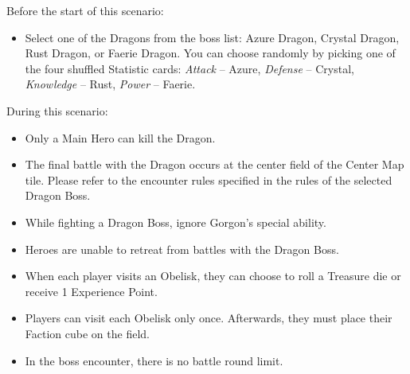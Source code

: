 \begin{multicols*}{2}
Before the start of this scenario:

\begin{itemize}
  \item Select one of the Dragons from the boss list: Azure Dragon, Crystal Dragon, Rust Dragon, or Faerie Dragon.
    You can choose randomly by picking one of the four shuffled Statistic cards: \textit{Attack} -- Azure, \textit{Defense} -- Crystal, \textit{Knowledge} -- Rust, \textit{Power} -- Faerie.
\end{itemize}

During this scenario:

\begin{itemize}
  \item Only a Main Hero can kill the Dragon.
  \item The final battle with the Dragon occurs at the center field of the Center Map tile.
    Please refer to the encounter rules specified in the rules of the selected Dragon Boss.
  \item While fighting a Dragon Boss, ignore Gorgon's special ability.
  \item Heroes are unable to retreat from battles with the Dragon Boss.
  \item When each player visits an Obelisk, they can choose to roll a Treasure die or receive 1 Experience Point.
  \item Players can visit each Obelisk only once.
    Afterwards, they must place their Faction cube on the field.
  \item In the boss encounter, there is no battle round limit.
\end{itemize}


\end{multicols*}

\clearpage

